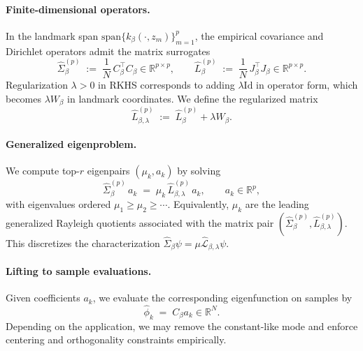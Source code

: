 \documentclass[11pt]{article}
\theoremstyle{remark}
\newcommand{\Id}{\mathrm{Id}}
\begin{document}
\paragraph{Finite-dimensional operators.}
In the landmark span $\mathrm{span}\{k_\beta(\cdot,z_m)\}_{m=1}^p$, the empirical covariance and Dirichlet operators admit the matrix surrogates
\begin{equation}
\widehat{\Sigma}_\beta^{(p)}
\;:=\;
\frac{1}{N}\,C_\beta^\top C_\beta
\in\mathbb{R}^{p\times p},
\qquad
\widehat{L}_\beta^{(p)}
\;:=\;
\frac{1}{N}\,J_\beta^\top J_\beta
\in\mathbb{R}^{p\times p}.
\label{eq:SigmaL_mats}
\end{equation}
Regularization $\lambda>0$ in RKHS corresponds to adding $\lambda\Id$ in operator form, which becomes $\lambda W_\beta$ in landmark coordinates.
We define the regularized matrix
\begin{equation}
\widehat{L}_{\beta,\lambda}^{(p)}
\;:=\;
\widehat{L}_\beta^{(p)} + \lambda W_\beta.
\label{eq:Llam_mat}
\end{equation}

\paragraph{Generalized eigenproblem.}
We compute top-$r$ eigenpairs $(\mu_k, a_k)$ by solving
\begin{equation}
\widehat{\Sigma}_\beta^{(p)}\, a_k
\;=\;
\mu_k\,
\widehat{L}_{\beta,\lambda}^{(p)}\, a_k,
\qquad
a_k\in\mathbb{R}^p,
\label{eq:gen_eig_mat}
\end{equation}
with eigenvalues ordered $\mu_1\ge \mu_2\ge \cdots$.
Equivalently, $\mu_k$ are the leading generalized Rayleigh quotients associated with the matrix pair $(\widehat{\Sigma}^{(p)}_\beta,\widehat{L}^{(p)}_{\beta,\lambda})$.
This discretizes the characterization $\widehat{\Sigma}_\beta \psi = \mu \widehat{\mathcal{L}}_{\beta,\lambda}\psi$.

\paragraph{Lifting to sample evaluations.}
Given coefficients $a_k$, we evaluate the corresponding eigenfunction on samples by
\begin{equation}
\widehat{\phi}_k
\;=\;
C_\beta a_k
\in\mathbb{R}^N.
\label{eq:lifting_pv}
\end{equation}
Depending on the application, we may remove the constant-like mode and enforce centering and orthogonality constraints empirically.
\end{document}

